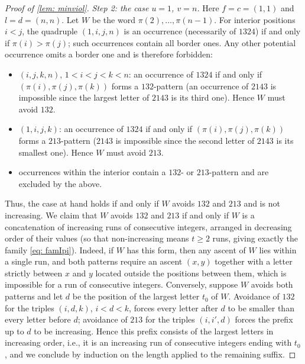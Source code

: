 \documentclass[10pt,a4paper]{amsart}
\begin{document}
\begin{proof}[Proof of \cref{lem: minviol}]
\emph{Step 2: the case $u=1$, $v=n$.}
Here $f=c=(1,1)$ and $l=d=(n,n)$. Let $W$ be the word $\pi(2),\dots,\pi(n-1)$.
For interior positions $i<j$, the quadruple $(1,i,j,n)$ is an occurrence (necessarily of $1324$) if and only if
$\pi(i)>\pi(j)$; such occurrences contain all border ones. Any other potential occurrence omits a border one and is
therefore forbidden:
\begin{itemize}
\item $(i,j,k,n)$, $1<i<j<k<n$: an occurrence of $1324$ if and only if $(\pi(i),\pi(j),\pi(k))$ forms a
$132$-pattern (an occurrence of $2143$ is impossible since the largest letter of $2143$ is its third one).
Hence $W$ must avoid $132$.
\item $(1,i,j,k)$: an occurrence of $1324$ if and only if $(\pi(i),\pi(j),\pi(k))$ forms a $213$-pattern
($2143$ is impossible since the second letter of $2143$ is its smallest one). Hence $W$ must avoid $213$.
\item occurrences within the interior contain a $132$- or $213$-pattern and are excluded by the above.
\end{itemize}
Thus, the case at hand holds if and only if $W$ avoids $132$ and $213$ and is not increasing.
We claim that $W$ avoids $132$ and $213$ if and only if $W$ is a concatenation of increasing runs of consecutive
integers, arranged in decreasing order of their values (so that non-increasing means $t\ge2$ runs, giving exactly the
family \cref{eq: famIpi}). Indeed, if $W$ has this form, then any ascent of $W$ lies within a single run, and both
patterns require an ascent $(x,y)$ together with a letter strictly between $x$ and $y$ located outside the positions
between them, which is impossible for a run of consecutive integers. Conversely, suppose $W$ avoids both patterns and
let $d$ be the position of the largest letter $t_0$ of $W$. Avoidance of $132$ for the triples $(i,d,k)$, $i<d<k$,
forces every letter after $d$ to be smaller than every letter before $d$; avoidance of $213$ for the triples
$(i,i',d)$ forces the prefix up to $d$ to be increasing. Hence this prefix consists of the largest letters in
increasing order, i.e., it is an increasing run of consecutive integers ending with $t_0$, and we conclude by
induction on the length applied to the remaining suffix.


\end{proof}
\end{document}
